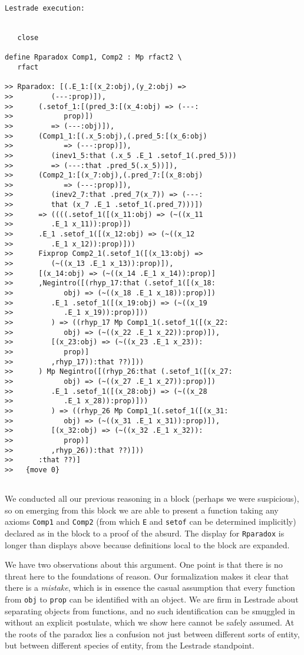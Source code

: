 \documentclass{article}
\begin{document}
\begin{verbatim}Lestrade execution:


   close

define Rparadox Comp1, Comp2 : Mp rfact2 \
   rfact

>> Rparadox: [(.E_1:[(x_2:obj),(y_2:obj) =>
>>         (---:prop)]),
>>      (.setof_1:[(pred_3:[(x_4:obj) => (---:
>>            prop)])
>>         => (---:obj)]),
>>      (Comp1_1:[(.x_5:obj),(.pred_5:[(x_6:obj)
>>            => (---:prop)]),
>>         (inev1_5:that (.x_5 .E_1 .setof_1(.pred_5)))
>>         => (---:that .pred_5(.x_5))]),
>>      (Comp2_1:[(x_7:obj),(.pred_7:[(x_8:obj)
>>            => (---:prop)]),
>>         (inev2_7:that .pred_7(x_7)) => (---:
>>         that (x_7 .E_1 .setof_1(.pred_7)))])
>>      => ((((.setof_1([(x_11:obj) => (~((x_11
>>         .E_1 x_11)):prop)])
>>      .E_1 .setof_1([(x_12:obj) => (~((x_12
>>         .E_1 x_12)):prop)]))
>>      Fixprop Comp2_1(.setof_1([(x_13:obj) =>
>>         (~((x_13 .E_1 x_13)):prop)]),
>>      [(x_14:obj) => (~((x_14 .E_1 x_14)):prop)]
>>      ,Negintro([(rhyp_17:that (.setof_1([(x_18:
>>            obj) => (~((x_18 .E_1 x_18)):prop)])
>>         .E_1 .setof_1([(x_19:obj) => (~((x_19
>>            .E_1 x_19)):prop)]))
>>         ) => ((rhyp_17 Mp Comp1_1(.setof_1([(x_22:
>>            obj) => (~((x_22 .E_1 x_22)):prop)]),
>>         [(x_23:obj) => (~((x_23 .E_1 x_23)):
>>            prop)]
>>         ,rhyp_17)):that ??)]))
>>      ) Mp Negintro([(rhyp_26:that (.setof_1([(x_27:
>>            obj) => (~((x_27 .E_1 x_27)):prop)])
>>         .E_1 .setof_1([(x_28:obj) => (~((x_28
>>            .E_1 x_28)):prop)]))
>>         ) => ((rhyp_26 Mp Comp1_1(.setof_1([(x_31:
>>            obj) => (~((x_31 .E_1 x_31)):prop)]),
>>         [(x_32:obj) => (~((x_32 .E_1 x_32)):
>>            prop)]
>>         ,rhyp_26)):that ??)]))
>>      :that ??)]
>>   {move 0}


\end{verbatim}

We conducted all our previous reasoning in a block (perhaps we were suspicious), so on emerging from this block we are able to present a function
taking any axioms {\tt Comp1} and {\tt Comp2} (from which {\tt E} and {\tt setof} can be determined implicitly) declared as in the block to a proof of the absurd.  The display for {\tt Rparadox} is longer than displays above because definitions local to the block are expanded.

We have two observations about this argument.  One point is that there is no threat here to the foundations of reason.  Our formalization makes it clear that there is a {\em mistake\/}, which is in essence the casual assumption that  every function from {\tt obj} to {\tt prop} can be identified with an object.  We are firm in Lestrade about separating objects from functions, and no such identification can be smuggled in without an explicit postulate, which we show here cannot be safely assumed.  At the roots of the paradox lies a confusion not just between different sorts of entity, but between different species of entity, from the Lestrade standpoint.
\end{document}
